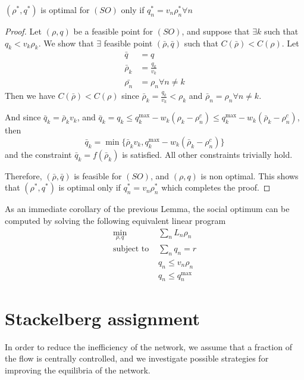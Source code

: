 \begin{lemma}
\label{lemma:relaxedTTT_is_ff}
$(\rho^*, q^*)$ is optimal for $(SO)$ only if $q^*_n = v_n \rho^*_n \forall n$
\end{lemma}


\begin{proof}
Let $( \rho,  q)$ be a feasible point for $(SO)$, and suppose that $\exists k$ such that $q_k < v_k \rho_k$. We show that $\exists$ feasible point $(\bar{ \rho}, \bar{ q})$ such that $C(\bar{ \rho}) < C( \rho)$.
Let
\begin{align*}
\bar{q} &= q\\
\bar{\rho}_k &= \frac{q_k}{v_k}\\
\bar{\rho_n} &= \rho_n \forall n \neq k
\end{align*}
Then we have $C(\bar{ \rho}) < C( \rho)$ since $\bar{\rho}_k = \frac{q_k}{v_k} < \rho_k$ and $\bar{\rho}_n = \rho_n \forall n \neq k$.

And since $\bar{q}_k = \bar{\rho}_k v_k$, and $\bar{q}_k = q_k \leq q_k^{\max} - w_k(\rho_k - \rho_n^c) \leq q_k^{\max} - w_k(\bar{\rho}_k - \rho_n^c)$, then
\[
\bar{q}_k = \min \{ \bar{\rho}_k v_k,  q_k^{\max} - w_k(\bar{\rho}_k - \rho_n^c) \}
\]
and the constraint $\bar{q}_k = f(\bar{\rho}_k)$ is satisfied. All other constraints trivially hold.

Therefore, $(\bar{ \rho}, \bar{ q})$ is feasible for $(SO)$, and $( \rho,  q)$ is non optimal. This shows that $( \rho^*,  q^*)$ is optimal only if $q^*_n = v_n \rho^*_n$ which completes the proof.
\end{proof}

\bigskip

As an immediate corollary of the previous Lemma, the social optimum can be computed by solving the following equivalent linear program
\begin{align*}
\min_{\rho, q}  &\sum_n L_n \rho_n\\
\text{subject to } & 
\sum_n q_n = r\\
& q_n \leq v_n \rho_n\\
& q_n \leq q_n^{\max}
\end{align*}



\section{Stackelberg assignment}
In order to reduce the inefficiency of the network, we assume that a fraction of the flow is centrally controlled, and we investigate possible strategies for improving the equilibria of the network. 



